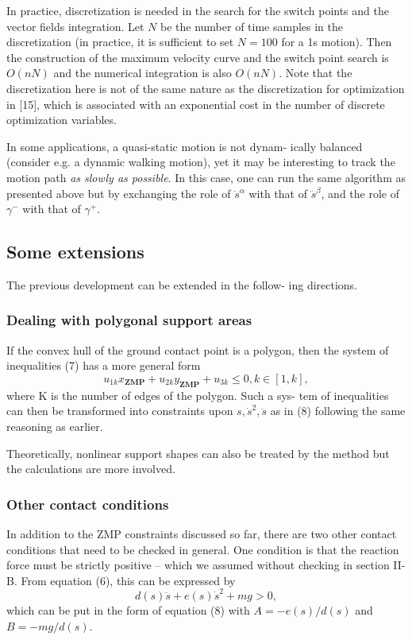 \documentclass[journal]{IEEEtran}
\begin{document}
In practice, discretization is needed in the search for the switch points and the vector fields integration. Let $N$ be the number of time samples in the discretization (in practice, it is sufficient to set $N = 100$ for a 1s motion). Then the construction of the maximum velocity curve and the switch
point search is $O(nN)$ and the numerical integration is also
$O(nN)$. Note that the discretization here is not of the same
nature as the discretization for optimization in [15], which is
associated with an exponential cost in the number of discrete
optimization variables.

In some applications, a quasi-static motion is not dynam-
ically balanced (consider e.g. a dynamic walking motion),
yet it may be interesting to track the motion path \emph{as slowly as possible}. In this case, one can run the same algorithm as
presented above but by exchanging the role of $\ddot{s}^{\alpha}$ with that
of $\ddot{s}^{\beta}$, and the role of $\gamma^{-}$ with that of $\gamma^{+}$.
\subsection{Some extensions}
The previous development can be extended in the follow-
ing directions.
\subsubsection{Dealing with polygonal support areas}
If the convex
hull of the ground contact point is a polygon, then the system
of inequalities (7) has a more general form
$$
u_{1k}x_{\textbf{ZMP}}+u_{2k}y_{\textbf{ZMP}}+u_{3k}\leq 0, k\in [1,k],
$$
where K is the number of edges of the polygon. Such a sys-
tem of inequalities can then be transformed into constraints
upon $s, \dot{s}^{2},\ddot{s}$ as in (8) following the same reasoning as earlier.

Theoretically, nonlinear support shapes can also be treated
by the method but the calculations are more involved.

\subsubsection{Other contact conditions}
In addition to the ZMP
constraints discussed so far, there are two other contact
conditions that need to be checked in general. One condition
is that the reaction force must be strictly positive -- which we
assumed without checking in section II-B. From equation (6),
this can be expressed by
$$
d(s)\ddot{s}+e(s)\dot{s}^{2}+mg>0,
$$
which can be put in the form of equation (8) with $A =
−e(s)/d(s)$ and $B = −mg/d(s)$.
\end{document}
